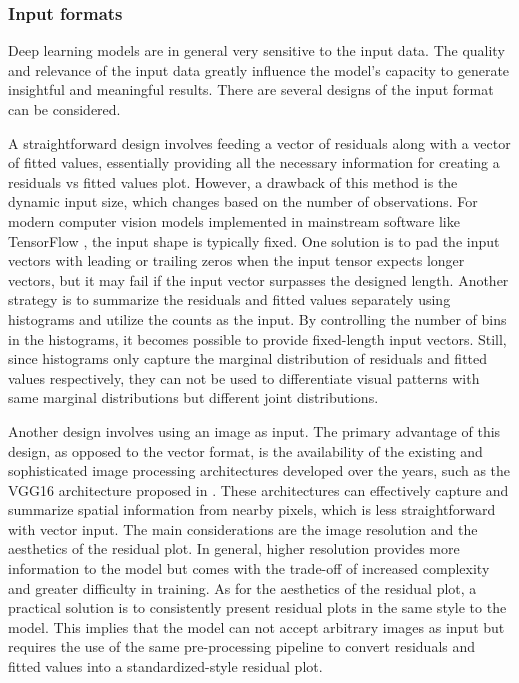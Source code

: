 \documentclass[]{interact}
\theoremstyle{plain}%
\theoremstyle{definition}
\theoremstyle{remark}
\begin{document}
\hypertarget{input-formats}{%
\subsubsection{Input formats}\label{input-formats}}

Deep learning models are in general very sensitive to the input data.
The quality and relevance of the input data greatly influence the
model's capacity to generate insightful and meaningful results. There
are several designs of the input format can be considered.

A straightforward design involves feeding a vector of residuals along
with a vector of fitted values, essentially providing all the necessary
information for creating a residuals vs fitted values plot. However, a
drawback of this method is the dynamic input size, which changes based
on the number of observations. For modern computer vision models
implemented in mainstream software like TensorFlow
\citep{abadi2016tensorflow}, the input shape is typically fixed. One
solution is to pad the input vectors with leading or trailing zeros when
the input tensor expects longer vectors, but it may fail if the input
vector surpasses the designed length. Another strategy is to summarize
the residuals and fitted values separately using histograms and utilize
the counts as the input. By controlling the number of bins in the
histograms, it becomes possible to provide fixed-length input vectors.
Still, since histograms only capture the marginal distribution of
residuals and fitted values respectively, they can not be used to
differentiate visual patterns with same marginal distributions but
different joint distributions.

Another design involves using an image as input. The primary advantage
of this design, as opposed to the vector format, is the availability of
the existing and sophisticated image processing architectures developed
over the years, such as the VGG16 architecture proposed in
\citet{simonyan2014very}. These architectures can effectively capture
and summarize spatial information from nearby pixels, which is less
straightforward with vector input. The main considerations are the image
resolution and the aesthetics of the residual plot. In general, higher
resolution provides more information to the model but comes with the
trade-off of increased complexity and greater difficulty in training. As
for the aesthetics of the residual plot, a practical solution is to
consistently present residual plots in the same style to the model. This
implies that the model can not accept arbitrary images as input but
requires the use of the same pre-processing pipeline to convert
residuals and fitted values into a standardized-style residual plot.
\end{document}
